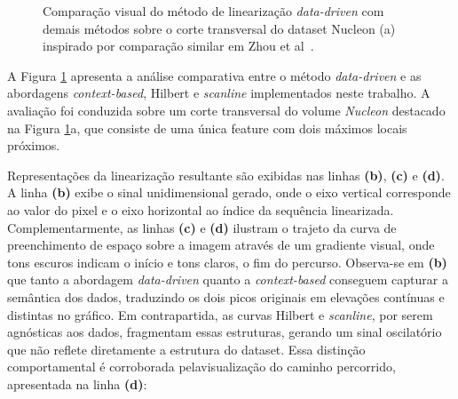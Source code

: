 \documentclass[12pt]{article}
\begin{document}
\begin{figure}[htbp]
    \caption{Comparação visual do método de linearização \textit{data-driven} com
    demais métodos sobre o corte transversal do dataset Nucleon (a) inspirado por
    comparação similar em Zhou et al~\cite{zhou:20}.
    }
    \label{fig:matrix_comparison_side}
\end{figure}


A Figura \ref{fig:matrix_comparison_side} apresenta a análise comparativa entre o método \textit{data-driven} e as
abordagens \textit{context-based}, Hilbert e \textit{scanline} implementados neste trabalho. A avaliação
foi conduzida sobre um corte transversal do volume \textit{Nucleon} destacado na Figura \ref{fig:matrix_comparison_side}a,
que consiste de uma única feature com dois máximos locais próximos.

Representações da linearização resultante são exibidas nas linhas \textbf{(b)}, \textbf{(c)} e \textbf{(d)}.
A linha \textbf{(b)} exibe o sinal unidimensional gerado, onde o eixo vertical corresponde ao valor do pixel e
o eixo horizontal ao índice da sequência linearizada.
Complementarmente, as linhas \textbf{(c)} e \textbf{(d)} ilustram
o trajeto da curva de preenchimento de espaço sobre a imagem através de um gradiente visual, onde tons
escuros indicam o início e tons claros, o fim do percurso.
Observa-se em \textbf{(b)} que tanto a abordagem
\textit{data-driven} quanto a \textit{context-based} conseguem capturar a semântica dos dados, traduzindo os
dois picos originais em elevações contínuas e distintas no gráfico. Em contrapartida, as curvas Hilbert
e \textit{scanline}, por serem agnósticas aos dados, fragmentam essas estruturas, gerando um sinal oscilatório que
não reflete diretamente a estrutura do dataset. Essa distinção comportamental é corroborada pelavisualização do caminho
percorrido, apresentada na linha \textbf{(d)}:
\end{document}
